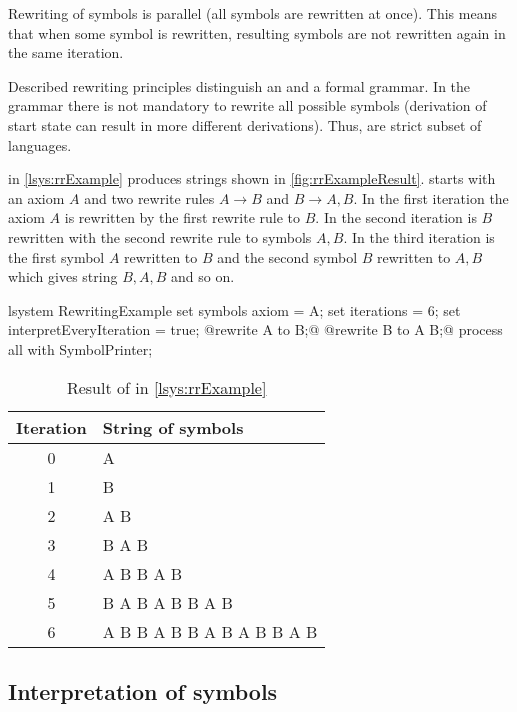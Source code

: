 Rewriting of symbols is parallel (all symbols are rewritten at once).
This means that when some symbol is rewritten, resulting symbols are not rewritten again in the same iteration.

Described rewriting principles distinguish an \lsystem and a formal grammar.
In the grammar there is not mandatory to rewrite all possible symbols (derivation of start state can result in more different derivations).
Thus, \lsystems are strict subset of languages.

\lsystem in \autoref{lsys:rrExample} produces strings shown in \autoref{fig:rrExampleResult}.
\lsystem starts with an axiom $A$ and two rewrite rules $A \rightarrow B$ and $B \rightarrow A, B$.
In the first iteration the axiom $A$ is rewritten by the first rewrite rule to $B$.
In the second iteration is $B$ rewritten with the second rewrite rule to symbols $A, B$.
In the third iteration is the first symbol $A$ rewritten to $B$ and the second symbol $B$ rewritten to $A, B$ which gives string $B, A, B$ and so on.

\begin{Lsystem}[label=lsys:rrExample,caption={Simple \lsystem as an example of rewriting principles}]
lsystem RewritingExample {
	set symbols axiom = A;
	set iterations = 6;
	set interpretEveryIteration = true;
	@rewrite A to B;@
	@rewrite B to A B;@
}
process all with SymbolPrinter;
\end{Lsystem}

\begin{table}[h]
	\centering
	\begin{tabular}{c l}
   		\toprule
   		Iteration & String of symbols \\
   		\midrule
		0 & A \\
		1 & B \\
		2 & A B \\
		3 & B A B \\
		4 & A B B A B \\
		5 & B A B A B B A B \\
		6 & A B B A B B A B A B B A B \\
		\bottomrule
	\end{tabular}
	\caption{Result of \lsystem in \autoref{lsys:rrExample}}
	\label{fig:rrExampleResult}
\end{table}


\subsection{Interpretation of \lsystem symbols}

